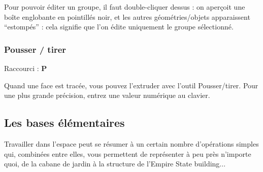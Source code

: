 \documentclass[a4paper,12pt,french]{sphinxmanual}
\begin{document}
Pour pouvoir éditer un groupe, il faut double-cliquer dessus : on aperçoit une boîte englobante en pointillés noir, et les autres géométries/objets apparaissent ``estompés'' : cela signifie que l'on édite uniquement le groupe sélectionné.


\subsubsection{Pousser / tirer}
\label{su/intro-su:pousser-tirer}
Raccourci : \textbf{P}

Quand une face est tracée, vous pouvez l'extruder avec l'outil Pousser/tirer. Pour une plus grande précision, entrez une valeur numérique au clavier.


\subsection{Les bases élémentaires}
\label{su/intro-su:les-bases-elementaires}
Travailler dans l'espace peut se résumer à un certain nombre d'opérations simples qui, combinées entre elles, vous permettent de représenter à peu près n'importe quoi, de la cabane de jardin à la structure de l'Empire State building...
\end{document}
